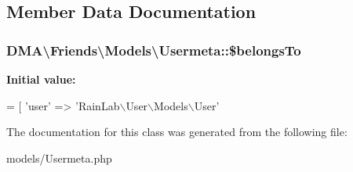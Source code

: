 \subsection{Member Data Documentation}
\hypertarget{classDMA_1_1Friends_1_1Models_1_1Usermeta_a93ae6777a48086374de412273d1d092e}{
\subsubsection[{\$belongs\-To}]{\setlength{\rightskip}{0pt plus 5cm}D\-M\-A\textbackslash{}\-Friends\textbackslash{}\-Models\textbackslash{}\-Usermeta\-::\$belongs\-To}}\label{classDMA_1_1Friends_1_1Models_1_1Usermeta_a93ae6777a48086374de412273d1d092e}
{\bfseries Initial value\-:}
\begin{DoxyCode}
= [
        \textcolor{stringliteral}{'user'}  => \textcolor{stringliteral}{'RainLab\(\backslash\)User\(\backslash\)Models\(\backslash\)User'}
\end{DoxyCode}


The documentation for this class was generated from the following file\-:\begin{DoxyCompactItemize}
\item 
models/Usermeta.\-php\end{DoxyCompactItemize}
